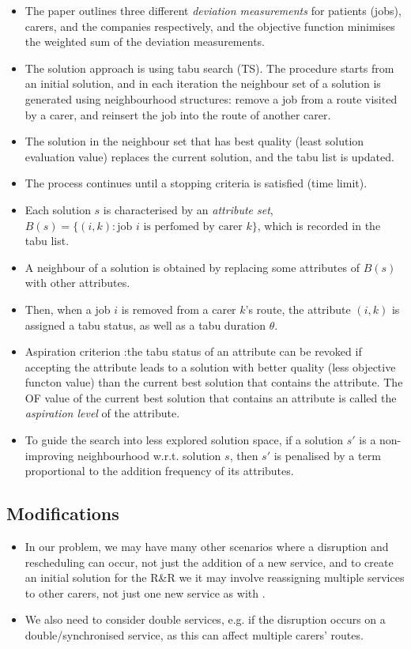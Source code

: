 \documentclass[a4paper]{article}
\begin{document}
\begin{itemize}[label=\textcolor{myPurple}{\textbullet},leftmargin=*,itemsep=-0.1em]
	\item The paper outlines three different \emph{deviation measurements} for patients (jobs), carers, and the companies respectively, and the objective function minimises the weighted sum of the deviation measurements.
	\item The solution approach is using tabu search (TS). The procedure starts from an initial solution, and in each iteration the neighbour set of a solution is generated using neighbourhood structures: remove a job from a route visited by a carer, and reinsert the job into the route of another carer. 
	\item The solution in the neighbour set that has best quality (least solution evaluation value) replaces the current solution, and the tabu list is updated.
	\item The process continues until a stopping criteria is satisfied (time limit).
	\item Each solution $s$ is characterised by an \emph{attribute set}, $B(s) = \{(i,k) : \text{job $i$ is perfomed by carer $k$}\}$, which is recorded in the tabu list.
	\item A neighbour of a solution is obtained by replacing some attributes of $B(s)$ with other attributes.
	\item Then, when a job $i$ is removed from a carer $k$'s route, the attribute $(i,k)$ is assigned a tabu status, as well as a tabu duration $\theta$. 
	\item Aspiration criterion :the tabu status of an attribute can be revoked if accepting the attribute leads to a solution with better quality (less objective functon value) than the current best solution that contains the attribute. The OF value of the current best solution that contains an attribute is called the \emph{aspiration level} of the attribute.
	\item To guide the search into less explored solution space, if a solution $s'$ is a non-improving neighbourhood w.r.t. solution $s$, then $s'$ is penalised by a term proportional to the addition frequency of its attributes.
\end{itemize}	

\subsection{Modifications}
\begin{itemize}[label=\textcolor{myPurple}{\textbullet},leftmargin=*,itemsep=-0.1em]
	\item In our problem, we may have many other scenarios where a disruption and rescheduling can occur, not just the addition of a new service, and to create an initial solution for the R\&R we it may involve reassigning multiple services to other carers, not just one new service as with \citep{yuan2017}.
	\item We also need to consider double services, e.g. if the disruption occurs on a double/synchronised service, as this can affect multiple carers' routes.
\end{itemize}
\end{document}
